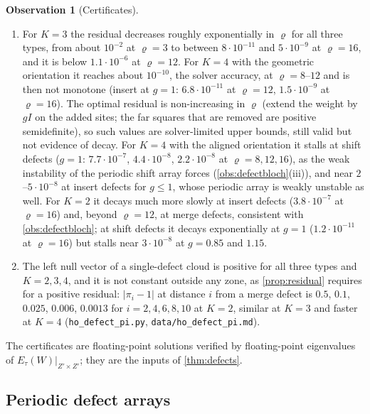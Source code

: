 \documentclass[11pt,a4paper]{article}
\theoremstyle{plain}
\theoremstyle{definition}
\newtheorem{observation}[theorem]{Observation}
\theoremstyle{remark}
\numberwithin{equation}{section}
\begin{document}
\begin{observation}[Certificates]\label{obs:cert}
\begin{enumerate}[label=(\roman*)]
\item For $K=3$ the residual decreases roughly exponentially in $\varrho$ for all three types, from about $10^{-2}$ at $\varrho=3$ to between $8\cdot10^{-11}$ and $5\cdot10^{-9}$ at $\varrho=16$, and it is below $1.1\cdot10^{-6}$ at $\varrho=12$. For $K=4$ with the geometric orientation it reaches about $10^{-10}$, the solver accuracy, at $\varrho=8$--$12$ and is then not monotone (insert at $g=1$: $6.8\cdot10^{-11}$ at $\varrho=12$, $1.5\cdot10^{-9}$ at $\varrho=16$). The optimal residual is non-increasing in $\varrho$ (extend the weight by $gI$ on the added sites; the far squares that are removed are positive semidefinite), so such values are solver-limited upper bounds, still valid but not evidence of decay. For $K=4$ with the aligned orientation it stalls at shift defects ($g=1$: $7.7\cdot10^{-7}$, $4.4\cdot10^{-8}$, $2.2\cdot10^{-8}$ at $\varrho=8,12,16$), as the weak instability of the periodic shift array forces (\cref{obs:defectbloch}(iii)), and near $2$--$5\cdot10^{-8}$ at insert defects for $g\le1$, whose periodic array is weakly unstable as well. For $K=2$ it decays much more slowly at insert defects ($3.8\cdot10^{-7}$ at $\varrho=16$) and, beyond $\varrho=12$, at merge defects, consistent with \cref{obs:defectbloch}; at shift defects it decays exponentially at $g=1$ ($1.2\cdot10^{-11}$ at $\varrho=16$) but stalls near $3\cdot10^{-8}$ at $g=0.85$ and $1.15$.
\item The left null vector of a single-defect cloud is positive for all three types and $K=2,3,4$, and it is not constant outside any zone, as \cref{prop:residual} requires for a positive residual: $|\pi_i-1|$ at distance $i$ from a merge defect is $0.5$, $0.1$, $0.025$, $0.006$, $0.0013$ for $i=2,4,6,8,10$ at $K=2$, similar at $K=3$ and faster at $K=4$ (\texttt{ho\_defect\_pi.py}, \texttt{data/ho\_defect\_pi.md}).
\end{enumerate}
The certificates are floating-point solutions verified by floating-point eigenvalues of $E_\tau(W)|_{Z'\times Z'}$; they are the inputs of \cref{thm:defects}.
\end{observation}

\subsection{Periodic defect arrays}
\end{document}
